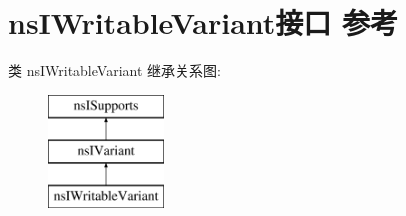 \hypertarget{interfacens_i_writable_variant}{}\section{ns\+I\+Writable\+Variant接口 参考}
\label{interfacens_i_writable_variant}
类 ns\+I\+Writable\+Variant 继承关系图\+:\begin{figure}[H]
\begin{center}
\leavevmode
\includegraphics[height=3.000000cm]{interfacens_i_writable_variant}
\end{center}
\end{figure}
